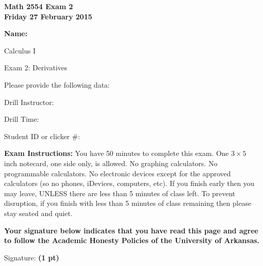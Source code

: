 \documentclass[12pt,letterpaper]{article}
\begin{document}
\flushleft
\begin{multicols}{2}
\textbf{Math 2554 Exam 2 \\
Friday 27 February 2015}

\textbf{Name:  }\underline{\hspace{45ex}} %

\vspace{.5in}

\end{multicols}

\pagestyle{empty}

\flushleft

\begin{center}\LARGE Calculus I 

Exam 2: Derivatives \end{center}

\vspace{1.5pc}
Please provide the following data:

\vspace{1.5pc}
Drill Instructor: \underline{\hspace{40ex}}

\vspace{1.5pc}
Drill Time: \underline{\hspace{40ex}}

\vspace{1.5pc}
Student ID or clicker \#: \underline{\hspace{40ex}}

\vspace{3pc}
{\bf Exam Instructions:} You have 50 minutes to complete this exam.  One $3\times 5$ inch notecard, one side only, is allowed.  No graphing calculators.  No programmable calculators.  No electronic devices except for the approved calculators (so no phones, iDevices, computers, etc).  If you finish early then you may leave, UNLESS there are less than 5 minutes of class left.  To prevent disruption, if you finish with less than 5 minutes of class remaining then please stay seated and quiet.

\vfill
\textbf{Your signature below indicates that you have read this page and agree to follow the Academic Honesty Policies of the University of Arkansas.}  

\vspace{2pc}
Signature: {\bf (1 pt)} \underline{\hspace{91ex}}
\end{document}
